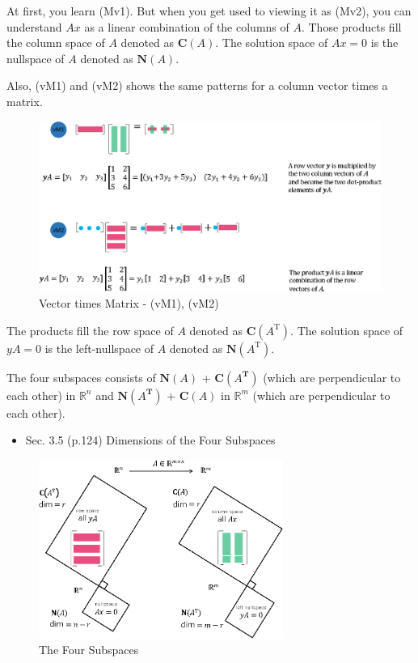 \documentclass[letterpaper]{article}
\DeclareRobustCommand\transp{^{\mathrm{T}}}
\begin{document}
At first, you learn (Mv1). But when you get used to viewing it as (Mv2),
you can understand $Ax$ as a linear combination of the columns of $A$.
Those products fill the column space of $A$  denoted as $\mathbf{C}(A)$.
The solution space of $Ax=0$ is the nullspace of $A$ denoted as $\mathbf{N}(A)$.

Also, (vM1) and (vM2) shows the same patterns for a column vector times a matrix.

\begin{figure}[H]
  \includegraphics[keepaspectratio, width=\linewidth]{VectorTimesMatrix.eps}
  \caption{Vector times Matrix - (vM1), (vM2)}
\end{figure}


The products fill the row space of $A$ denoted as $\mathbf{C}(A\transp)$.
The solution space of $yA=0$ is the left-nullspace of $A$ denoted as $\mathbf{N}(A\transp)$.


The four subspaces consists of $\mathbf{N}(A)$ + $\mathbf{C}(A^\mathbf{T})$ 
(which are perpendicular to each other) in $\mathbb{R}^n$ and
$\mathbf{N}(A^\mathbf{T})$ + $\mathbf{C}(A)$ in $\mathbb{R}^m$
(which are perpendicular to each other).


\begin{itemize}
  \item Sec. 3.5 (p.124) Dimensions of the Four Subspaces
\end{itemize} 

\begin{figure}[H]
  \centering
  \includegraphics[keepaspectratio, width=8cm]{4-Subspaces.eps}
  \caption{The Four Subspaces}
\end{figure}
\end{document}
